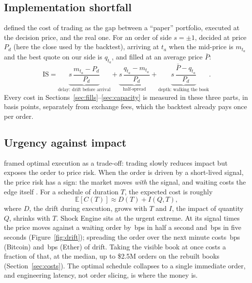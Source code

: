 \documentclass[11pt,a4paper]{article}
\newcommand{\bps}{\,bps}
\begin{document}
\subsection{Implementation shortfall}
\citet{perold1988} defined the cost of trading as the gap between a ``paper'' portfolio, executed at the decision price, and the
real one. For an order of side $s=\pm1$, decided at price $P_d$ (here the close used by the backtest), arriving at $t_a$ when the
mid-price is $m_{t_a}$ and the best quote on our side is $q_{t_a}$, and filled at an average price $\bar P$:
\begin{equation}
\mathrm{IS}
= \underbrace{s\,\frac{m_{t_a}-P_d}{P_d}}_{\text{delay: drift before arrival}}
+ \underbrace{s\,\frac{q_{t_a}-m_{t_a}}{P_d}}_{\text{half-spread}}
+ \underbrace{s\,\frac{\bar P-q_{t_a}}{P_d}}_{\text{depth: walking the book}} .
\label{eq:is}
\end{equation}
Every cost in Sections~\ref{sec:fills}--\ref{sec:capacity} is measured in these three parts, in basis points, separately from
exchange fees, which the backtest already pays once per order.

\subsection{Urgency against impact}
\citet{almgrenchriss2000} framed optimal execution as a trade-off: trading slowly reduces impact but exposes the order to price
risk. When the order is driven by a short-lived signal, the price risk has a sign: the market moves \emph{with} the signal, and
waiting costs the edge itself \citep{cartea2015}. For a schedule of duration $T$, the expected cost is roughly
\begin{equation}
\mathbb{E}[C(T)] \approx D(T) + I(Q,T),
\label{eq:urgency}
\end{equation}
where $D$, the drift during execution, grows with $T$ and $I$, the impact of quantity $Q$, shrinks with $T$. Shock Engine sits
at the urgent extreme. At its signal times the price moves against a waiting order by \DriftHalf\bps{} in half a second and
\DriftFive\bps{} in five seconds (Figure~\ref{fig:drift}); spreading the order over the next minute costs \MinuteDriftBtc\bps{}
(Bitcoin) and \MinuteDriftEth\bps{} (Ether) of drift. Taking the visible book at once costs a fraction of that, at the median, up
to \$2.5M orders on the rebuilt books (Section~\ref{sec:costs}). The optimal schedule collapses to a single immediate order, and engineering latency, not
order slicing, is where the money is.
\end{document}
